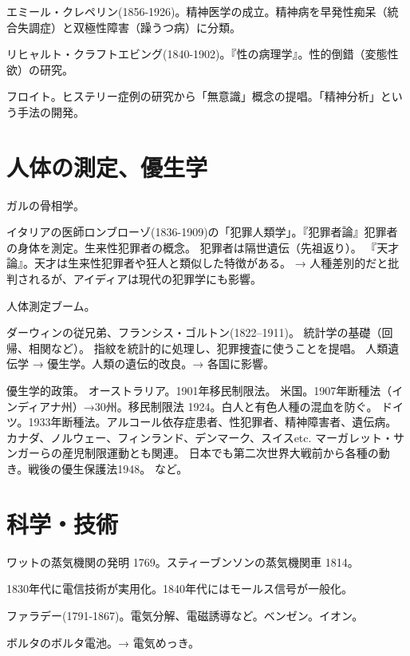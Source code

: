 \documentclass[uplatex,dvipdfmx]{jsarticle}
\begin{document}
エミール・クレペリン(1856-1926)。精神医学の成立。精神病を早発性痴呆（統合失調症）と双極性障害（躁うつ病）に分類。

リヒャルト・クラフトエビング(1840-1902)。『性の病理学』。性的倒錯（変態性欲）の研究。

フロイト。ヒステリー症例の研究から「無意識」概念の提唱。「精神分析」という手法の開発。


\section{人体の測定、優生学}


ガルの骨相学。


\citet{darmon89:_medec_et_assas}

イタリアの医師ロンブローゾ(1836-1909)の「犯罪人類学」。『犯罪者論』犯罪者の身体を測定。生来性犯罪者の概念。
犯罪者は隔世遺伝（先祖返り）。
『天才論』。天才は生来性犯罪者や狂人と類似した特徴がある。
 → 人種差別的だと批判されるが、アイディアは現代の犯罪学にも影響。

 人体測定ブーム。
 \citet{darmon89:_medec_et_assas}




ダーウィンの従兄弟、フランシス・ゴルトン(1822--1911)。
統計学の基礎（回帰、相関など）。
指紋を統計的に処理し、犯罪捜査に使うことを提唱。
 人類遺伝学 → 優生学。人類の遺伝的改良。→ 各国に影響。




優生学的政策。
オーストラリア。1901年移民制限法。
米国。1907年断種法（インディアナ州）→30州。移民制限法 1924。白人と有色人種の混血を防ぐ。
ドイツ。1933年断種法。アルコール依存症患者、性犯罪者、精神障害者、遺伝病。
カナダ、ノルウェー、フィンランド、デンマーク、スイスetc.
マーガレット・サンガーらの産児制限運動とも関連。
日本でも第二次世界大戦前から各種の動き。戦後の優生保護法1948。
\citet{米本昌平00:優生学}など。


\section{科学・技術}



ワットの蒸気機関の発明 1769。スティーブンソンの蒸気機関車 1814。

1830年代に電信技術が実用化。1840年代にはモールス信号が一般化。

ファラデー(1791-1867)。電気分解、電磁誘導など。ベンゼン。イオン。

ボルタのボルタ電池。→ 電気めっき。
\end{document}
